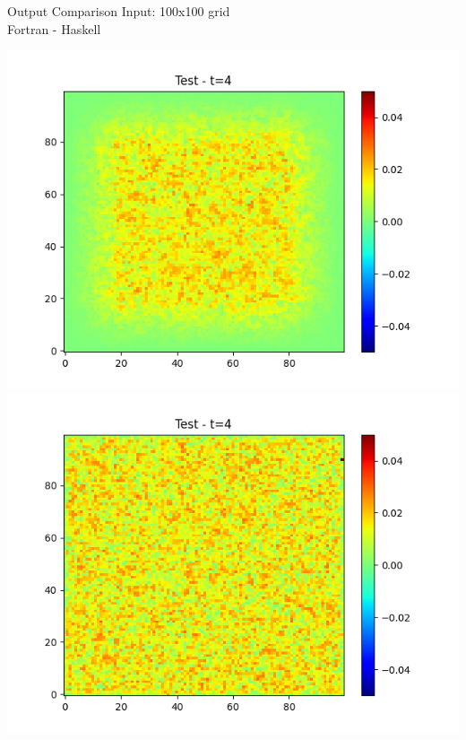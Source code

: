 \documentclass{beamer}
\begin{document}
\begin{frame}{Output Comparison}
    Input: 100x100 grid\\
    Fortran - Haskell
    \begin{center}
        \includegraphics[scale=0.32]{figure/frame_4.png}
        \includegraphics[scale=0.32]{figure/frame_2_4.png}
    \end{center}
\end{frame}
\end{document}
